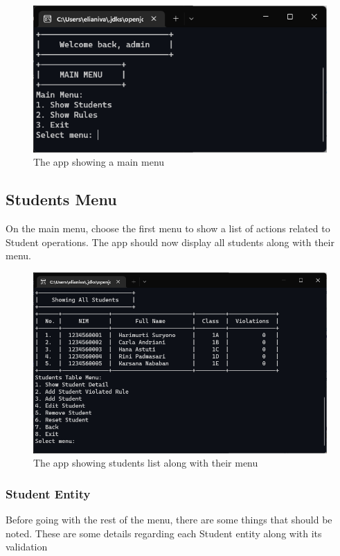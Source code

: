 \documentclass[12pt,titlepage]{article}
\begin{document}
\begin{figure}[h]
    \centering
    \includegraphics[width=.8\textwidth]{images/main-menu.png}
    \caption{The app showing a main menu}
\end{figure}

\subsection{Students Menu}
On the main menu, choose the first menu to show a list of actions related to Student operations.
The app should now display all students along with their menu.

\begin{figure}[h]
    \centering
    \includegraphics[width=.8\textwidth]{images/student-menu.png}
    \caption{The app showing students list along with their menu}
\end{figure}

\subsubsection{Student Entity}
Before going with the rest of the menu, there are some things that should be noted.
These are some details regarding each Student entity along with its validation
\end{document}
